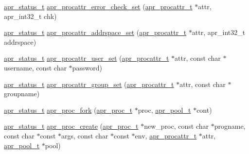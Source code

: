 \begin{DoxyCompactItemize}
\item 
\hyperlink{group__apr__errno_gaf76ee4543247e9fb3f3546203e590a6c}{apr\-\_\-status\-\_\-t} \hyperlink{group__apr__thread__proc_ga24076f050e9385af09ad8c3931d8dc43}{apr\-\_\-procattr\-\_\-error\-\_\-check\-\_\-set} (\hyperlink{group__apr__thread__proc_ga0d83919a6a0dd609598a864917f8b339}{apr\-\_\-procattr\-\_\-t} $\ast$attr, apr\-\_\-int32\-\_\-t chk)
\item 
\hyperlink{group__apr__errno_gaf76ee4543247e9fb3f3546203e590a6c}{apr\-\_\-status\-\_\-t} \hyperlink{group__apr__thread__proc_ga0f1dd02408995767efcb9c0d9c775620}{apr\-\_\-procattr\-\_\-addrspace\-\_\-set} (\hyperlink{group__apr__thread__proc_ga0d83919a6a0dd609598a864917f8b339}{apr\-\_\-procattr\-\_\-t} $\ast$attr, apr\-\_\-int32\-\_\-t addrspace)
\item 
\hyperlink{group__apr__errno_gaf76ee4543247e9fb3f3546203e590a6c}{apr\-\_\-status\-\_\-t} \hyperlink{group__apr__thread__proc_ga741ed3dc047b935b091a21528c49bb19}{apr\-\_\-procattr\-\_\-user\-\_\-set} (\hyperlink{group__apr__thread__proc_ga0d83919a6a0dd609598a864917f8b339}{apr\-\_\-procattr\-\_\-t} $\ast$attr, const char $\ast$username, const char $\ast$password)
\item 
\hyperlink{group__apr__errno_gaf76ee4543247e9fb3f3546203e590a6c}{apr\-\_\-status\-\_\-t} \hyperlink{group__apr__thread__proc_ga391f0d3831a5894ea2118762789a395d}{apr\-\_\-procattr\-\_\-group\-\_\-set} (\hyperlink{group__apr__thread__proc_ga0d83919a6a0dd609598a864917f8b339}{apr\-\_\-procattr\-\_\-t} $\ast$attr, const char $\ast$groupname)
\item 
\hyperlink{group__apr__errno_gaf76ee4543247e9fb3f3546203e590a6c}{apr\-\_\-status\-\_\-t} \hyperlink{group__apr__thread__proc_ga3d0415bf69b0a629a929833e82758b85}{apr\-\_\-proc\-\_\-fork} (\hyperlink{structapr__proc__t}{apr\-\_\-proc\-\_\-t} $\ast$proc, \hyperlink{group__apr__pools_gaf137f28edcf9a086cd6bc36c20d7cdfb}{apr\-\_\-pool\-\_\-t} $\ast$cont)
\item 
\hyperlink{group__apr__errno_gaf76ee4543247e9fb3f3546203e590a6c}{apr\-\_\-status\-\_\-t} \hyperlink{group__apr__thread__proc_gab51dd90b98d365a969f0ec5c7bef4e14}{apr\-\_\-proc\-\_\-create} (\hyperlink{structapr__proc__t}{apr\-\_\-proc\-\_\-t} $\ast$new\-\_\-proc, const char $\ast$progname, const char $\ast$const $\ast$args, const char $\ast$const $\ast$env, \hyperlink{group__apr__thread__proc_ga0d83919a6a0dd609598a864917f8b339}{apr\-\_\-procattr\-\_\-t} $\ast$attr, \hyperlink{group__apr__pools_gaf137f28edcf9a086cd6bc36c20d7cdfb}{apr\-\_\-pool\-\_\-t} $\ast$pool)

\end{DoxyCompactItemize}
